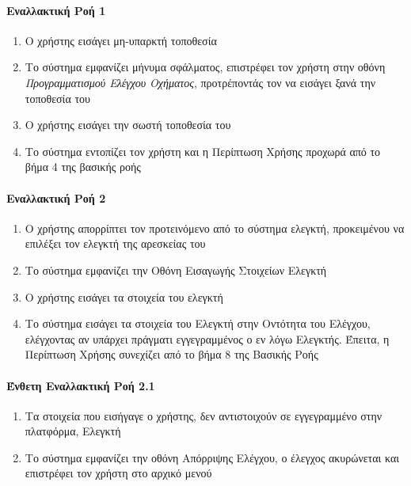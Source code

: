 \documentclass{../ol-softwaremanual}
\begin{document}
	
	
	\paragraph{Εναλλακτική Ροή 1}
	
	\begin{enumerate}
		\item Ο χρήστης εισάγει μη-υπαρκτή τοποθεσία
		\item Το σύστημα εμφανίζει μήνυμα σφάλματος, επιστρέφει τον χρήστη στην οθόνη \textit{Προγραμματισμού Ελέγχου Οχήματος}, προτρέποντάς τον να εισάγει ξανά την τοποθεσία του
		\item Ο χρήστης εισάγει την σωστή τοποθεσία του
		\item Το σύστημα εντοπίζει τον χρήστη και η Περίπτωση Χρήσης προχωρά από το βήμα 4 της βασικής ροής
	\end{enumerate}
	
	\paragraph{Εναλλακτική Ροή 2}
	
	\begin{enumerate}
		\item Ο χρήστης απορρίπτει τον προτεινόμενο από το σύστημα ελεγκτή, προκειμένου να επιλέξει τον ελεγκτή της αρεσκείας του
		\item Το σύστημα εμφανίζει την Οθόνη Εισαγωγής Στοιχείων Ελεγκτή
		\item Ο χρήστης εισάγει τα στοιχεία του ελεγκτή
		\item Το σύστημα εισάγει τα στοιχεία του Ελεγκτή στην Οντότητα του Ελέγχου, ελέγχοντας αν υπάρχει πράγματι εγγεγραμμένος ο εν λόγω Ελεγκτής. Έπειτα, η Περίπτωση Χρήσης συνεχίζει από το βήμα 8 της Βασικής Ροής
	\end{enumerate}	
	
	\paragraph{Ένθετη Εναλλακτική Ροή 2.1}
	
	\begin{enumerate}
		\item Τα στοιχεία που εισήγαγε ο χρήστης, δεν αντιστοιχούν σε εγγεγραμμένο στην πλατφόρμα, Ελεγκτή
		\item Το σύστημα εμφανίζει την οθόνη Απόρριψης Ελέγχου, ο έλεγχος ακυρώνεται και επιστρέφει τον χρήστη στο αρχικό μενού
	\end{enumerate}
	
\end{document}
